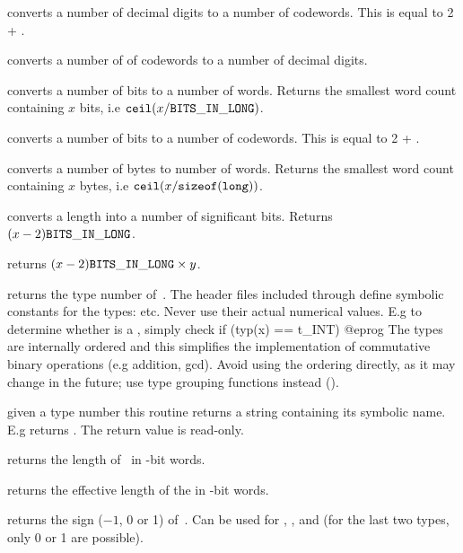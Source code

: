  converts a number of decimal digits to a number
of codewords. This is equal to 2 + .

 converts a number of of codewords to a
number of decimal digits.

 converts a number of bits to a number of
words. Returns the smallest word count containing $x$ bits, i.e $
{\tt ceil}(x / {\tt BITS\_IN\_LONG})$.

 converts a number of bits to a number of
codewords. This is equal to 2 + .

 converts a number of bytes to number of
words. Returns the smallest word count containing $x$ bytes, i.e
${\tt ceil}(x / {\tt sizeof(long)})$.

 converts a  length into a number
of significant bits. Returns $(x - 2){\tt BITS\_IN\_LONG}$.

 returns $(x - 2){\tt BITS\_IN\_LONG} \times y$.


 returns the type number of~. The header files
included through  define symbolic constants for the 
types:  etc. Never use their actual numerical values. E.g to determine
whether  is a , simply check
\bprog
  if (typ(x) == t_INT) { }
@eprog\noindent
The types are internally ordered and this simplifies the implementation of
commutative binary operations (e.g addition, gcd). Avoid using the ordering
directly, as it may change in the future; use type grouping functions
instead ().

 given a type number  this routine
returns a string containing its symbolic name. E.g 
returns . The return value is read-only.

 returns the length of~ in \B-bit words.

 returns the effective length of the  
in \B-bit words.

 returns the sign ($-1$, 0 or 1) of~. Can be
used for , ,  and  (for the last two
types, only 0 or 1 are possible).

